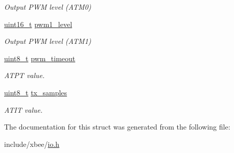 \begin{DoxyCompactItemize}
\begin{DoxyCompactList}\small\item\em Output P\-W\-M level (A\-T\-M0) \end{DoxyCompactList}\item 
\hypertarget{group__xbee__io_gaeb45f3abc59a12070b903f6b832b9de5}{\hyperlink{group__hal_ga5a8b2dc9e45a9ee81a94ef304fb62505}{uint16\-\_\-t} \hyperlink{group__xbee__io_gaeb45f3abc59a12070b903f6b832b9de5}{pwm1\-\_\-level}}\label{group__xbee__io_gaeb45f3abc59a12070b903f6b832b9de5}

\begin{DoxyCompactList}\small\item\em Output P\-W\-M level (A\-T\-M1) \end{DoxyCompactList}\item 
\hypertarget{group__xbee__io_ga2c9a187c0282faada2a305e02f9ac0e0}{\hyperlink{group__hal_gae1affc9ca37cfb624959c866a73f83c2}{uint8\-\_\-t} \hyperlink{group__xbee__io_ga2c9a187c0282faada2a305e02f9ac0e0}{pwm\-\_\-timeout}}\label{group__xbee__io_ga2c9a187c0282faada2a305e02f9ac0e0}

\begin{DoxyCompactList}\small\item\em A\-T\-P\-T value. \end{DoxyCompactList}\item 
\hypertarget{group__xbee__io_ga7483aa3631522522a66c78b0f7f946f7}{\hyperlink{group__hal_gae1affc9ca37cfb624959c866a73f83c2}{uint8\-\_\-t} \hyperlink{group__xbee__io_ga7483aa3631522522a66c78b0f7f946f7}{tx\-\_\-samples}}\label{group__xbee__io_ga7483aa3631522522a66c78b0f7f946f7}

\begin{DoxyCompactList}\small\item\em A\-T\-I\-T value. \end{DoxyCompactList}\end{DoxyCompactItemize}


The documentation for this struct was generated from the following file\-:\begin{DoxyCompactItemize}
\item 
include/xbee/\hyperlink{io_8h}{io.\-h}\end{DoxyCompactItemize}

